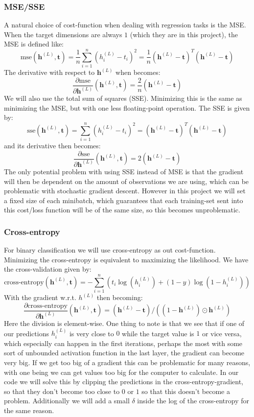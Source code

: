 \documentclass{article}
\begin{document}
\subsubsection{MSE/SSE}
A natural choice of cost-function when dealing with regression tasks is the MSE.
When the target dimensions are always $1$ (which they are in this project), the
MSE is defined like:
$$\text{mse}(\bm{h}^{(L)}, \bm{t}) = \frac{1}{n} \sum_{i=1}^n (h^{(L)}_i - t_i)^2 = \frac{1}{n}(\bm{h}^{(L)} - \bm{t})^T (\bm{h}^{(L)} - \bm{t})$$
The derivative with respect to $\bm{h}^{(L)}$ when becomes:
$$\frac{\partial \text{mse}}{\partial \bm{h}^{(L)}}(\bm{h}^{(L)}, \bm{t}) = \frac{2}{n} (\bm{h}^{(L)} - \bm{t})$$
We will also use the total sum of squares (SSE). Minimizing this is the same as
minimizing the MSE, but with one less floating-point operation. The SSE is given
by:
$$\text{sse}(\bm{h}^{(L)}, \bm{t}) = \sum_{i=1}^n (h^{(L)}_i - t_i)^2 = (\bm{h}^{(L)} - \bm{t})^T (\bm{h}^{(L)} - \bm{t})$$
and its derivative then becomes:
$$\frac{\partial \text{sse}}{\partial \bm{h}^{(L)}}(\bm{h}^{(L)}, \bm{t}) = 2(\bm{h}^{(L)} - \bm{t})$$
The only potential problem with using SSE instead of MSE is that the gradient
will then be dependent on the amount of observations we are using, which can be
problematic with stochastic gradient descent. However in this project we will
set a fixed size of each minibatch, which guarantees that each training-set sent
into this cost/loss function will be of the same size, so this becomes
unproblematic.

\subsubsection{Cross-entropy}
For binary classification we will use cross-entropy as out cost-function.
Minimizing the cross-entropy is equivalent to maximizing the likelihood. We have
the cross-validation given by:
$$\text{cross-entropy}(\bm{h}^{(L)}, \bm{t}) = -\sum_{i=1}^{n} ( t_{i} \log(h^{(L)}_i) + (1 - y) \log(1 - h^{(L)}_i) )$$
With the gradient w.r.t. $h^{(L)}$ then becoming:
$$\frac{\partial \text{cross-entropy}}{\partial \bm{h}^{(L)}}(\bm{h}^{(L)}, \bm{t}) = (\bm{h}^{(L)} - \bm{t}) / ((1 - \bm{h}^{(L)}) \odot \bm{h}^{(L)})$$
Here the division is element-wise. One thing to note is that we see that if one of
our predictions $h^{(L)}_i$ is very close to $0$ while the target value is $1$
or vice versa, which especially can happen in the first iterations, perhaps the
most with some sort of unbounded activation function in the last layer, the
gradient can become very big. If we get too big of a gradient this can be
problematic for many reasons, with one being we can get values too big for the
computer to calculate. In our code we will solve this by clipping the
predictions in the cross-entropy-gradient, so that they don't become too close
to $0$ or $1$ so that this doesn't become a problem. Additionally we will add a
small $\delta$ inside the log of the cross-entropy for the same reason.
\end{document}
